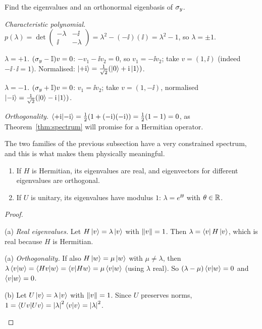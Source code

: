 \begin{example}\label{ex:eigen-y}
  Find the eigenvalues and an orthonormal eigenbasis of $\sigma_y$.
\end{example}
\begin{solution}
  \begin{steps}
    \item \emph{Characteristic polynomial.} $p(\lambda)=\det\begin{pmatrix}-\lambda&-\ii\\\ii&-\lambda\end{pmatrix}=\lambda^2-(-\ii)(\ii)=\lambda^2-1$, so $\lambda=\pm1$.
    \item \emph{$\lambda=+1$.} $(\sigma_y-\mathbb{I})v=0$: $-v_1-\ii v_2=0$, so $v_1=-\ii v_2$; take $v=(1,\ii)$ (indeed $-\ii\cdot\ii=1$). Normalised: $\left|+\mathrm{i}\right\rangle=\frac1{\sqrt2}(\left|0\right\rangle+\mathrm{i}\left|1\right\rangle)$.
    \item \emph{$\lambda=-1$.} $(\sigma_y+\mathbb{I})v=0$: $v_1=\ii v_2$; take $v=(1,-\ii)$, normalised $\left|-\mathrm{i}\right\rangle=\frac1{\sqrt2}(\left|0\right\rangle-\mathrm{i}\left|1\right\rangle)$.
    \item \emph{Orthogonality.} $\left\langle+\mathrm{i}\middle|-\mathrm{i}\right\rangle=\tfrac12(1+(-\mathrm{i})(-\mathrm{i}))=\tfrac12(1-1)=0$, as Theorem~\ref{thm:spectrum} will promise for a Hermitian operator.
  \end{steps}
\end{solution}

The two families of the previous subsection have a very constrained spectrum, and this is what makes them physically meaningful.

\begin{theorem}\label{thm:spectrum}
  \begin{enumerate}
    \item[(a)] If $H$ is Hermitian, its eigenvalues are real, and eigenvectors for different eigenvalues are orthogonal.
    \item[(b)] If $U$ is unitary, its eigenvalues have modulus $1$: $\lambda=e^{\ii\theta}$ with $\theta\in\mathbb{R}$.
  \end{enumerate}
\end{theorem}
\begin{proof}
  \begin{steps}
    \item (a) \emph{Real eigenvalues.} Let $H\left|v\right\rangle=\lambda\left|v\right\rangle$ with $\left\|v\right\|=1$. Then $\lambda=\left\langle v\right|H\left|v\right\rangle$, which is real because $H$ is Hermitian.
    \item (a) \emph{Orthogonality.} If also $H\left|w\right\rangle=\mu\left|w\right\rangle$ with $\mu\neq\lambda$, then $\lambda\left\langle v\middle|w\right\rangle=\left\langle Hv\middle|w\right\rangle=\left\langle v\middle|Hw\right\rangle=\mu\left\langle v\middle|w\right\rangle$ (using $\lambda$ real). So $(\lambda-\mu)\left\langle v\middle|w\right\rangle=0$ and $\left\langle v\middle|w\right\rangle=0$.
    \item (b) Let $U\left|v\right\rangle=\lambda\left|v\right\rangle$ with $\left\|v\right\|=1$. Since $U$ preserves norms, $1=\left\langle Uv\middle|Uv\right\rangle=\left|\lambda\right|^2\left\langle v\middle|v\right\rangle=\left|\lambda\right|^2$. \qedhere
  \end{steps}
\end{proof}

